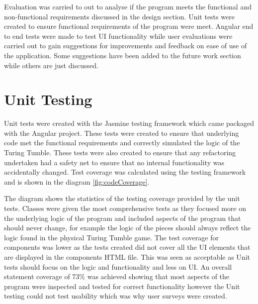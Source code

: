 \documentclass{l4proj}
\begin{document}
Evaluation was carried to out to analyse if the program meets the functional and non-functional requirements discussed in the design section. Unit tests were created to ensure functional requirements of the program were meet. Angular end to end tests were made to test UI functionality while user evaluations were carried out to gain suggestions for improvements and feedback on ease of use of the application. Some suggestions have been added to the future work section while others are just discussed. 

\section{Unit Testing}
Unit tests were created with the Jasmine testing framework which came packaged with the Angular project. These tests were created to ensure that underlying code met the functional requirements and correctly simulated the logic of the Turing Tumble. These tests were also created to ensure that any refactoring undertaken had a safety net to ensure that no internal functionality was accidentally changed. Test coverage was calculated using the testing framework and is shown in the diagram \ref{fig:codeCoverage}. 

The diagram shows the statistics of the testing coverage provided by the unit tests. Classes were given the most comprehensive tests as they focused more on the underlying logic of the program and included aspects of the program that should never change, for example the logic of the pieces should always reflect the logic found in the physical Turing Tumble game. The test coverage for components was lower as the tests created did not cover all the UI elements that are displayed in the components HTML file. This was seen as acceptable as Unit tests should focus on the logic and functionality and less on UI. An overall statement coverage of 73\% was achieved showing that most aspects of the program were inspected and tested for correct functionality however the Unit testing could not test usability which was why user surveys were created.
\end{document}
